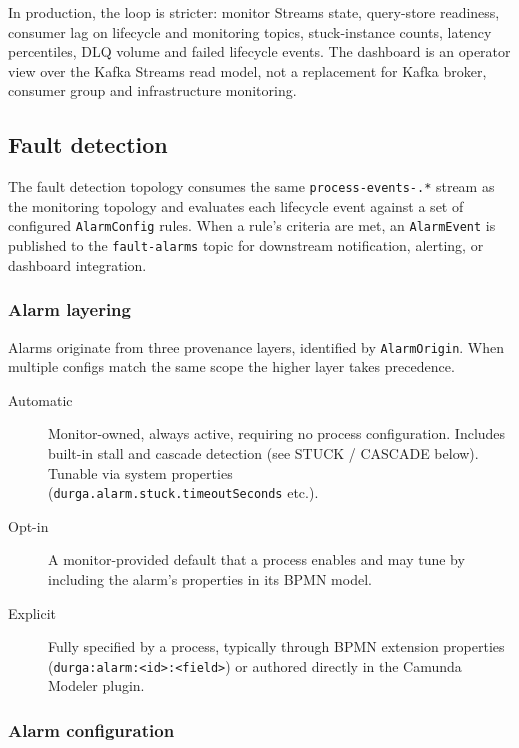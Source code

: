 In production, the loop is stricter: monitor Streams state, query-store
readiness, consumer lag on lifecycle and monitoring topics, stuck-instance
counts, latency percentiles, DLQ volume and failed lifecycle events. The
dashboard is an operator view over the Kafka Streams read model, not a
replacement for Kafka broker, consumer group and infrastructure monitoring.

\subsection{Fault detection}

\label{sec:FaultDetection}

The fault detection topology consumes the same \texttt{process-events-.*}
stream as the monitoring topology and evaluates each lifecycle event against
a set of configured \texttt{AlarmConfig} rules. When a rule's criteria are
met, an \texttt{AlarmEvent} is published to the \texttt{fault-alarms} topic
for downstream notification, alerting, or dashboard integration.

\subsubsection{Alarm layering}

Alarms originate from three provenance layers, identified by
\texttt{AlarmOrigin}. When multiple configs match the same scope the higher layer
takes precedence.

\begin{description}
\item[Automatic] Monitor-owned, always active, requiring no process configuration.
  Includes built-in stall and cascade detection (see STUCK / CASCADE below).
  Tunable via system properties \\ (\texttt{durga.alarm.stuck.timeoutSeconds} etc.).
\item[Opt-in] A monitor-provided default that a process enables and may tune by
  including the alarm's properties in its BPMN model.
\item[Explicit] Fully specified by a process, typically through BPMN extension
  properties \\ (\texttt{durga:alarm:<id>:<field>}) or authored directly in the
  Camunda Modeler plugin.
\end{description}

\subsubsection{Alarm configuration}

